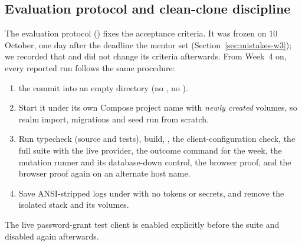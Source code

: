 \subsection{Evaluation protocol and clean-clone discipline}
The evaluation protocol () fixes the acceptance criteria. It was frozen on 10 October, one day after the deadline the mentor set (Section~\ref{sec:mistakes-w3}); we recorded that and did not change its criteria afterwards. From Week~4 on, every reported run follows the same procedure:
\begin{enumerate}
  \item {} the commit into an empty directory (no , no ).
  \item Start it under its own Compose project name with \emph{newly created} volumes, so realm import, migrations and seed run from scratch.
  \item Run typecheck (source and tests), build, , the client-configuration check, the full suite with the live provider, the outcome command for the week, the mutation runner and its database-down control, the browser proof, and the browser proof again on an alternate host name.
  \item Save ANSI-stripped logs under  with no tokens or secrets, and remove the isolated stack and its volumes.
\end{enumerate}
The live password-grant test client is enabled explicitly before the suite and disabled again afterwards.
